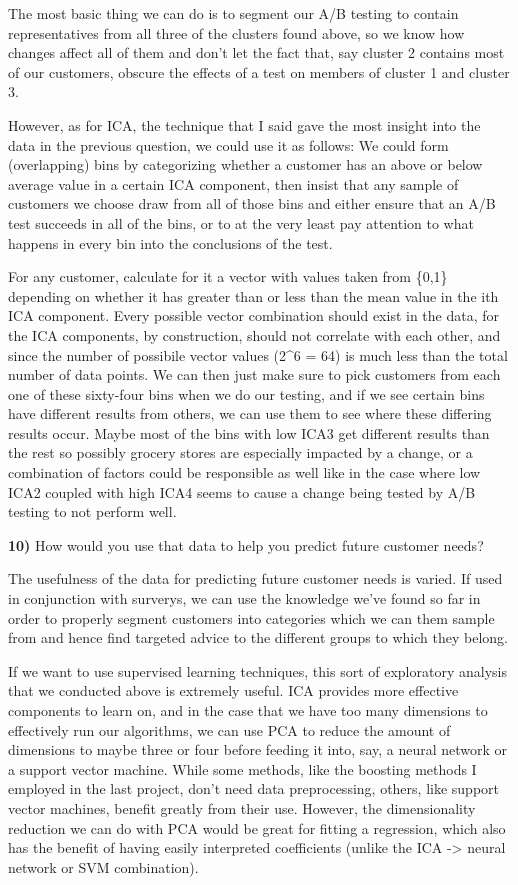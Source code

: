 \documentclass{article}
\begin{document}
The most basic thing we can do is to segment our A/B testing to contain
representatives from all three of the clusters found above, so we know
how changes affect all of them and don't let the fact that, say cluster
2 contains most of our customers, obscure the effects of a test on
members of cluster 1 and cluster 3.

However, as for ICA, the technique that I said gave the most insight
into the data in the previous question, we could use it as follows: We
could form (overlapping) bins by categorizing whether a customer has an
above or below average value in a certain ICA component, then insist
that any sample of customers we choose draw from all of those bins and
either ensure that an A/B test succeeds in all of the bins, or to at the
very least pay attention to what happens in every bin into the
conclusions of the test.

For any customer, calculate for it a vector with values taken from
\{0,1\} depending on whether it has greater than or less than the mean
value in the ith ICA component. Every possible vector combination should
exist in the data, for the ICA components, by construction, should not
correlate with each other, and since the number of possibile vector
values (2\^{}6 = 64) is much less than the total number of data points.
We can then just make sure to pick customers from each one of these
sixty-four bins when we do our testing, and if we see certain bins have
different results from others, we can use them to see where these
differing results occur. Maybe most of the bins with low ICA3 get
different results than the rest so possibly grocery stores are
especially impacted by a change, or a combination of factors could be
responsible as well like in the case where low ICA2 coupled with high
ICA4 seems to cause a change being tested by A/B testing to not perform
well.

    \textbf{10)} How would you use that data to help you predict future
customer needs?

    The usefulness of the data for predicting future customer needs is
varied. If used in conjunction with surverys, we can use the knowledge
we've found so far in order to properly segment customers into
categories which we can them sample from and hence find targeted advice
to the different groups to which they belong.

If we want to use supervised learning techniques, this sort of
exploratory analysis that we conducted above is extremely useful. ICA
provides more effective components to learn on, and in the case that we
have too many dimensions to effectively run our algorithms, we can use
PCA to reduce the amount of dimensions to maybe three or four before
feeding it into, say, a neural network or a support vector machine.
While some methods, like the boosting methods I employed in the last
project, don't need data preprocessing, others, like support vector
machines, benefit greatly from their use. However, the dimensionality
reduction we can do with PCA would be great for fitting a regression,
which also has the benefit of having easily interpreted coefficients
(unlike the ICA -\textgreater{} neural network or SVM combination).


    
    
    
    
\end{document}
